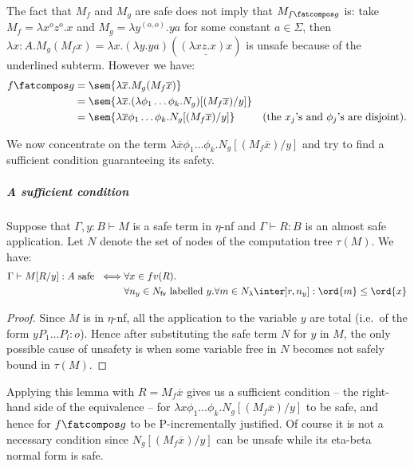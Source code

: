 The fact that $M_f$ and $M_g$ are safe does not imply that $M_{f\fatcompos g}$ is: take $M_f = \lambda x^o z^o.x$ and $M_g = \lambda y^{(o,o)} . y a$ for some constant $a\in \Sigma$, then $\lambda x:A . M_g (M_f x) = \lambda x . (\lambda y . y a) ( \underline{(\lambda x z.x) x} )$ is unsafe because of the underlined subterm. However we have:
\begin{align*}
f\fatcompos g &= \sem{\lambda \overline{x} . M_g (M_f  \overline{x})} \\
 &= \sem{\lambda \overline{x} . (\lambda \phi_1\ldots \phi_k . N_g) [(M_f \overline{x}) / y]} \\
&= \sem{\lambda \overline{x} \phi_1 \dots \phi_k. N_g [(M_f  \overline{x}) / y]}
& \mbox{(the $x_j$'s and $\phi_j$'s are disjoint)}.
\end{align*}

We now concentrate on the term  $\lambda \overline{x} \phi_1 \dots
\phi_k. N_g [(M_f  \overline{x}) / y]$ and try to find a sufficient
condition guaranteeing its safety.

\subparagraph{A sufficient condition}
\begin{lemma}
Suppose that $\Gamma,y:B \vdash M$ is a safe term in $\eta$-nf and $\Gamma \vdash R : B$ is an almost safe application. Let $N$ denote the set of nodes of the computation tree $\tau(M)$. We have:
\begin{align*}
\Gamma \vdash M[R/y] :A \mbox{ safe }
\iff&  \forall x \in fv(R) . \\
    & \forall n_y \in N_{\sf fv} \mbox{ labelled $y$}.
      \forall m \in N_{\lambda} \inter ]r,n_y] : \ord{m} \leq \ord{x}
\end{align*}
\end{lemma}
\begin{proof}
Since $M$ is in $\eta$-nf, all the application to the variable $y$ are total (i.e.~of the form $y P_1 \ldots P_l :o$). Hence after substituting the safe term $N$ for $y$ in $M$, the only possible cause of unsafety is when
some variable free in $N$ becomes not safely bound in $\tau(M)$.
\end{proof}

Applying this lemma with $R= M_f \overline{x}$ gives us a sufficient
condition -- the right-hand side of the equivalence -- for $\lambda
x \phi_1 \dots \phi_k. N_g [(M_f \overline{x}) / y]$ to be safe, and
hence for $f\fatcompos g$ to be P-incrementally justified. Of course
it is not a necessary condition since $N_g[(M_f \overline{x}) /y]$
can be unsafe while its eta-beta normal form is safe.

